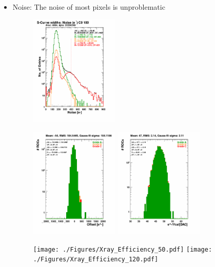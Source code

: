 \documentclass[a4paper,12pt,twoside]{article}
\begin{document}
\begin{itemize}
\item Noise:
The noise of most pixels is unproblematic
\begin{figure} [h!] \centering 
\includegraphics[width=0.4\textwidth, angle=0] {./Figures/Xray_NoisePerPixel.pdf}
\end{figure}

\begin{figure} [h!] \centering 
\includegraphics[width=0.4\textwidth, angle=0] {./Figures/Xray_VcalOffset.pdf}
\includegraphics[width=0.4\textwidth, angle=0] {./Figures/Xray_VcalSlope.pdf}
\end{figure}

\begin{figure} [h!] \centering 
\texttt{[image: ./Figures/Xray\_Efficiency\_50.pdf]}
\texttt{[image: ./Figures/Xray\_Efficiency\_120.pdf]}
\end{figure}
\end{itemize}
\end{document}
